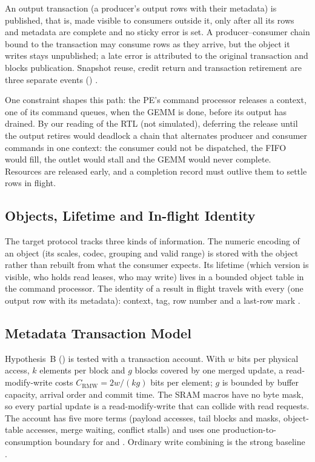 %
An output transaction (a producer's output rows with their metadata) is published, that is, made visible to consumers outside it, only after all its rows and metadata are complete and no sticky error is set.
A producer--consumer chain bound to the transaction may consume rows as they arrive, but the object it writes stays unpublished; a late error is attributed to the original transaction and blocks publication.
Snapshot reuse, credit return and transaction retirement are three separate events ()
.

%
One constraint shapes this path: the PE's command processor releases a context, one of its command queues, when the GEMM is done, before its output has drained.
By our reading of the RTL (not simulated), deferring the release until the output retires would deadlock a chain that alternates producer and consumer commands in one context: the consumer could not be dispatched, the \handoff FIFO would fill, the outlet would stall and the GEMM would never complete.
Resources are released early, and a completion record must outlive them to settle rows in flight.

\subsection{Objects, Lifetime and In-flight Identity}\label{sec:objects}

%
The target protocol tracks three kinds of information.
The numeric encoding of an object (its scales, codec, grouping and valid range) is stored with the object rather than rebuilt from what the consumer expects.
Its lifetime (which version is visible, who holds read leases, who may write) lives in a bounded object table in the command processor.
The identity of a result in flight travels with every \capsule (one output row with its metadata): context, tag, row number and a last-row mark
.

\subsection{Metadata Transaction Model}\label{sec:metadata}

%
Hypothesis~B () is tested with a transaction account.
With $w$ bits per physical \sidecar access, $k$ elements per block and $g$ blocks covered by one merged update, a read-modify-write costs $C_{\mathrm{RMW}}=2w/(kg)$ bits per element; $g$ is bounded by buffer capacity, arrival order and commit time.
The SRAM macros have no byte mask, so every partial update is a read-modify-write that can collide with read requests.
The account has five more terms (payload accesses, tail blocks and masks, object-table accesses, merge waiting, conflict stalls) and uses one production-to-consumption boundary for \armBM and \armSM.
Ordinary write combining is the strong baseline
.
